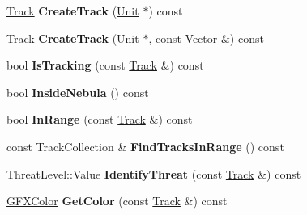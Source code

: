 \begin{DoxyCompactItemize}
\item 
\hyperlink{classRadar_1_1Track}{Track} {\bfseries Create\+Track} (\hyperlink{classUnit}{Unit} $\ast$) const \hypertarget{classRadar_1_1Sensor_a247ccda6cbf998c1f1042e809d3b21bf}{}\label{classRadar_1_1Sensor_a247ccda6cbf998c1f1042e809d3b21bf}

\item 
\hyperlink{classRadar_1_1Track}{Track} {\bfseries Create\+Track} (\hyperlink{classUnit}{Unit} $\ast$, const Vector \&) const \hypertarget{classRadar_1_1Sensor_a414834dbe5192b5c4c9725f8a65b1c78}{}\label{classRadar_1_1Sensor_a414834dbe5192b5c4c9725f8a65b1c78}

\item 
bool {\bfseries Is\+Tracking} (const \hyperlink{classRadar_1_1Track}{Track} \&) const \hypertarget{classRadar_1_1Sensor_affe6927b96a44109f65aa54c4d3ebf27}{}\label{classRadar_1_1Sensor_affe6927b96a44109f65aa54c4d3ebf27}

\item 
bool {\bfseries Inside\+Nebula} () const \hypertarget{classRadar_1_1Sensor_ab08288041a7339734271fc0da19e39f2}{}\label{classRadar_1_1Sensor_ab08288041a7339734271fc0da19e39f2}

\item 
bool {\bfseries In\+Range} (const \hyperlink{classRadar_1_1Track}{Track} \&) const \hypertarget{classRadar_1_1Sensor_abeef1f843d07d48a2482519bbc5b879a}{}\label{classRadar_1_1Sensor_abeef1f843d07d48a2482519bbc5b879a}

\item 
const Track\+Collection \& {\bfseries Find\+Tracks\+In\+Range} () const \hypertarget{classRadar_1_1Sensor_a8aa80468a1d4570c492590ec8e8e7537}{}\label{classRadar_1_1Sensor_a8aa80468a1d4570c492590ec8e8e7537}

\item 
Threat\+Level\+::\+Value {\bfseries Identify\+Threat} (const \hyperlink{classRadar_1_1Track}{Track} \&) const \hypertarget{classRadar_1_1Sensor_a7eb99a4e4ae19541be759bfa167295a9}{}\label{classRadar_1_1Sensor_a7eb99a4e4ae19541be759bfa167295a9}

\item 
\hyperlink{structGFXColor}{G\+F\+X\+Color} {\bfseries Get\+Color} (const \hyperlink{classRadar_1_1Track}{Track} \&) const \hypertarget{classRadar_1_1Sensor_a038479bccb11f622532ae9b28c72148f}{}\label{classRadar_1_1Sensor_a038479bccb11f622532ae9b28c72148f}

\end{DoxyCompactItemize}
